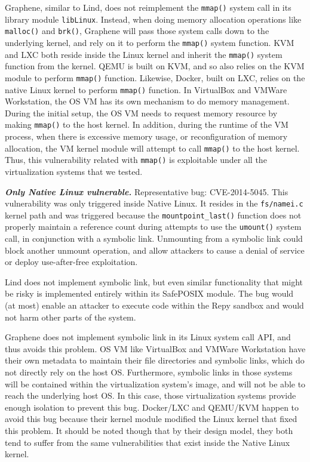 {{Graphene, similar to Lind, does not reimplement the
\texttt{mmap()} system call in its library module \texttt{libLinux}. Instead, when doing
memory allocation operations like \texttt{malloc()} and \texttt{brk()}, Graphene will
pass those system calls down to the underlying kernel, and rely on it to
perform the \texttt{mmap()} system function.
KVM and LXC both reside inside the Linux kernel and inherit the \texttt{mmap()} system function
from the kernel. QEMU is built on KVM, and so also relies on the KVM module to perform \texttt{mmap()}
function. Likewise, Docker, built on LXC, relies on the native Linux kernel to perform \texttt{mmap()}
function. In VirtualBox and VMWare Workstation, the OS VM has its own mechanism to
do memory management. During the initial setup, the OS VM needs to request memory resource
by making \texttt{mmap()} to the host kernel. In addition, during the runtime of the VM process,
when there is excessive memory usage, or reconfiguration of memory allocation, the VM kernel module
will attempt to call \texttt{mmap()} to the host kernel. Thus, this vulnerability related with \texttt{mmap()}
is exploitable under all the virtualization systems that we tested.

\emph{\textbf{Only Native Linux vulnerable.}}  Representative bug: CVE-2014-5045.
This vulnerability was only triggered inside Native Linux. It resides in the
\texttt{fs/namei.c} kernel path and was triggered because
the \texttt{mountpoint\_last()}
function does not properly
maintain a reference count during attempts to use the \texttt{umount()} system call,
in conjunction with a symbolic link. Unmounting from a symbolic link could block
another unmount operation, and allow attackers to cause a denial of service or
deploy use-after-free exploitation.

Lind does not implement symbolic link, but
even similar functionality that might be risky is implemented entirely
within its SafePOSIX module. The bug would (at most) enable an attacker to execute
code within the Repy sandbox and would not harm other parts of the system.

Graphene does not implement symbolic link in its Linux system call API, and thus avoids
this problem.
OS VM like VirtualBox and VMWare Workstation have their own metadata to maintain their file
directories and symbolic links, which do not directly rely on the host OS.
Furthermore, symbolic links in those systems will be contained within the virtualization system's image,
and will not be able to reach the underlying host OS. In this case, those virtualization systems provide enough
isolation to prevent this bug.
Docker/LXC and QEMU/KVM happen to avoid this bug because their kernel module modified the Linux kernel
that fixed this problem. It should be noted though that by their design model, they both tend to suffer from
the same vulnerabilities that exist inside the Native Linux kernel.

}}
